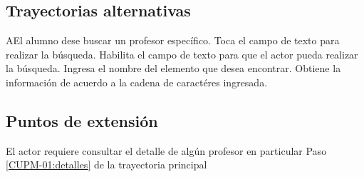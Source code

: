 	\subsection{Trayectorias alternativas}
	
\begin{UCtrayectoriaA}{A}{El alumno dese buscar un profesor específico.}
	\UCpaso[\UCactor] Toca el campo de texto para realizar la búsqueda.
	\UCpaso[\UCsist] Habilita el campo de texto para que el actor pueda realizar la búsqueda.
	\UCpaso[\UCactor] Ingresa el nombre del elemento que desea encontrar.
	\UCpaso[\UCsist] Obtiene la información de acuerdo a la cadena de caractéres ingresada. 
\end{UCtrayectoriaA}
	
	
	
	
	\subsection{Puntos de extensión}
	
	\UCExtensionPoint
	{El actor requiere consultar el detalle de algún profesor en particular}
	{ Paso \ref{CUPM-01:detalles} de la trayectoria principal}
	{}
